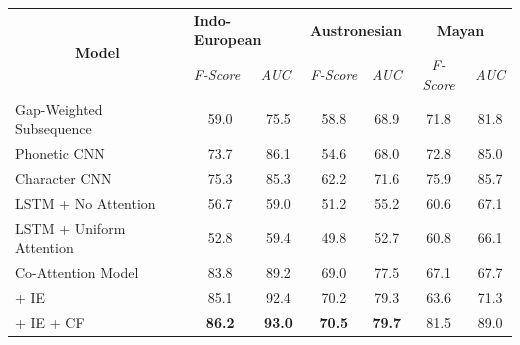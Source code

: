 \documentclass[11pt,letterpaper]{article}
\begin{document}
\begin{table}[t]
\centering

\begin{tabular}{lcccccc}
\multicolumn{1}{c}{\multirow{2}{*}{\textbf{Model}}} & \multicolumn{2}{l}{\textbf{Indo-European}}                              & \multicolumn{2}{c}{\textbf{Austronesian}} & \multicolumn{2}{c}{\textbf{Mayan}} \\ \cline{2-7} 
\multicolumn{1}{c}{}                                & \multicolumn{1}{l}{\textit{F-Score}} & \multicolumn{1}{l}{\textit{AUC}} & \textit{F-Score}      & \textit{AUC}      & \textit{F-Score}  & \textit{AUC}   \\ \hline
Gap-Weighted Subsequence                            & 59.0                                 & 75.5                             & 58.8                  & 68.9              & 71.8              & 81.8           \\
Phonetic CNN                                         & 73.7                                 & 86.1                             & 54.6                  & 68.0              & 72.8              & 85.0           \\
Character CNN                                        & 75.3                                 & 85.3                             & 62.2                  & 71.6              & 75.9              & 85.7           \\
LSTM + No Attention                                 & 56.7                                 & 59.0                             & 51.2                  & 55.2              & 60.6              & 67.1           \\
LSTM + Uniform Attention                            & 52.8                                 & 59.4                             & 49.8                  & 52.7              & 60.8              & 66.1           \\ \hline
Co-Attention Model                                  & 83.8                                 & 89.2                             & 69.0                  & 77.5              & 67.1              & 67.7           \\
\quad + IE                             & 85.1                                 & 92.4                             & 70.2                  & 79.3              & 63.6              & 71.3           \\
\quad + IE + CF                                  & \textbf{86.2}                                 & \textbf{93.0}                             & \textbf{70.5}         & \textbf{79.7}     & 81.5              & 89.0           \\

\end{tabular}
\end{table}
\end{document}
